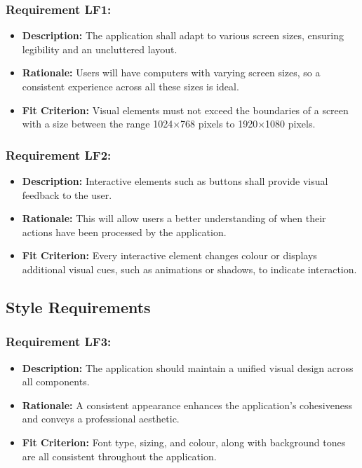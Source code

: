 \documentclass[12pt]{article}
\begin{document}
\subsubsection*{Requirement LF1:}
\begin{itemize}
  \item \textbf{Description:} The application shall adapt to various screen sizes, ensuring legibility and an uncluttered layout.
  \item \textbf{Rationale:} Users will have computers with varying screen sizes, so a consistent experience across all these sizes is ideal.
  \item \textbf{Fit Criterion:} Visual elements must not exceed the boundaries of a screen with a size between the range 1024×768 pixels to 1920×1080 pixels.
\end{itemize}
\subsubsection*{Requirement LF2:}
\begin{itemize}
  \item \textbf{Description:} Interactive elements such as buttons shall provide visual feedback to the user.
  \item \textbf{Rationale:} This will allow users a better understanding of when their actions have been processed by the application.
  \item \textbf{Fit Criterion:} Every interactive element changes colour or displays additional visual cues, such as animations or shadows, to indicate interaction.
\end{itemize}
\subsection{Style Requirements}
\subsubsection*{Requirement LF3:}
\begin{itemize}
  \item \textbf{Description:} The application should maintain a unified visual design across all components.
  \item \textbf{Rationale:} A consistent appearance enhances the application's cohesiveness and conveys a professional aesthetic.
  \item \textbf{Fit Criterion:} Font type, sizing, and colour, along with background tones are all consistent throughout the application.
\end{itemize}
\end{document}
